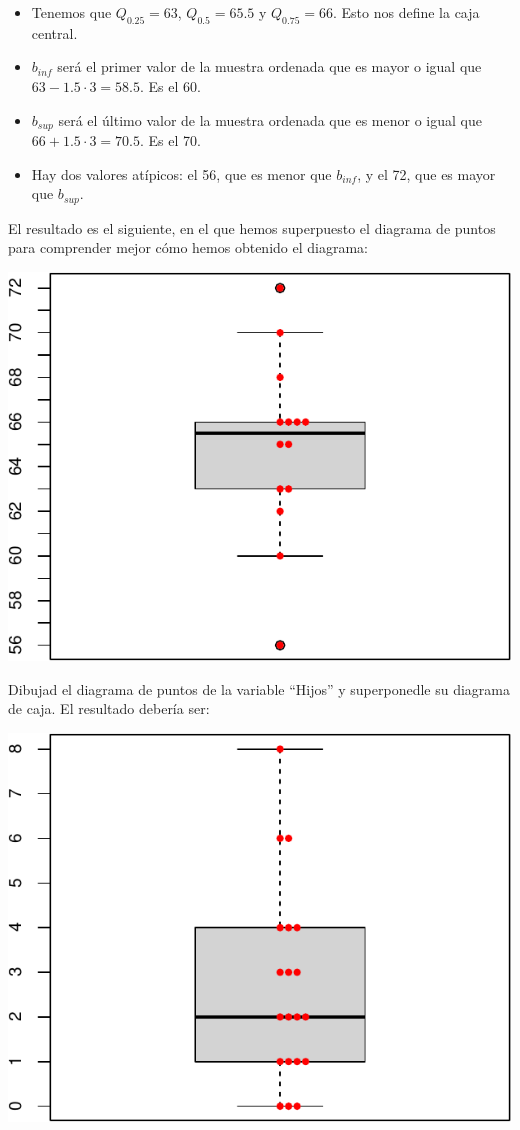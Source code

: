 \documentclass[
]{book}
\theoremstyle{definition}
\theoremstyle{definition}
\theoremstyle{definition}
\theoremstyle{definition}
\theoremstyle{remark}
\begin{document}
\begin{itemize}
\item
  Tenemos que \(Q_{0.25}=63\), \(Q_{0.5}=65.5\) y \(Q_{0.75}=66\). Esto nos define la caja central.
\item
  \(b_{inf}\) será el primer valor de la muestra ordenada que es mayor o igual que \(63- 1.5\cdot 3=58.5\). Es el 60.
\item
  \(b_{sup}\) será el último valor de la muestra ordenada que es menor o igual que \(66+ 1.5\cdot 3=70.5\). Es el 70.
\item
  Hay dos valores atípicos: el 56, que es menor que \(b_{inf}\), y el 72, que es mayor que \(b_{sup}\).
\end{itemize}

El resultado es el siguiente, en el que hemos superpuesto el diagrama de puntos para comprender mejor cómo hemos obtenido el diagrama:

\begin{center}\includegraphics[width=0.5\linewidth]{INREMDN_files/figure-latex/unnamed-chunk-274-1} \end{center}

\begin{rmdexercici}
Dibujad el diagrama de puntos de la variable ``Hijos'' y superponedle su diagrama de caja. El resultado debería ser:
\end{rmdexercici}

\begin{center}\includegraphics[width=0.5\linewidth]{INREMDN_files/figure-latex/unnamed-chunk-276-1} \end{center}
\end{document}
